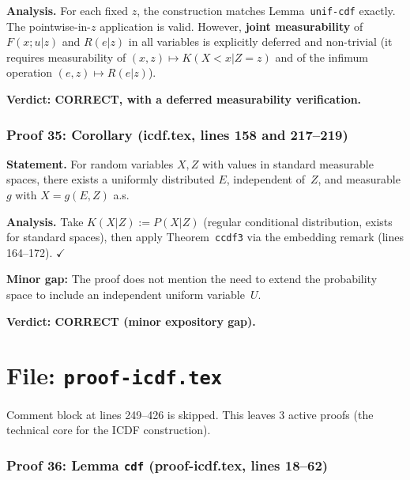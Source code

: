 \documentclass{article}
\begin{document}
\textbf{Analysis.}
For each fixed $z$, the construction matches Lemma~\texttt{unif-cdf} exactly.
The pointwise-in-$z$ application is valid.
However, \textbf{joint measurability} of $F(x;u|z)$ and $R(e|z)$ in all variables
is explicitly deferred and non-trivial (it requires measurability of
$(x,z)\mapsto K(X<x|Z=z)$ and of the infimum operation $(e,z)\mapsto R(e|z)$).

\textbf{Verdict: CORRECT, with a deferred measurability verification.}

\section{Proof 35: Corollary (icdf.tex, lines 158 and 217--219)}

\textbf{Statement.} For random variables $X,Z$ with values in standard measurable
spaces, there exists a uniformly distributed $E$, independent of~$Z$, and
measurable $g$ with $X=g(E,Z)$ a.s.

\textbf{Analysis.}
Take $K(X|Z):=P(X|Z)$ (regular conditional distribution, exists for standard
spaces), then apply Theorem~\texttt{ccdf3} via the embedding remark (lines 164--172).  $\checkmark$

\textbf{Minor gap:} The proof does not mention the need to extend the probability
space to include an independent uniform variable~$U$.

\textbf{Verdict: CORRECT (minor expository gap).}

\part*{File: \texttt{proof-icdf.tex}}

Comment block at lines 249--426 is skipped.
This leaves 3 active proofs (the technical core for the ICDF construction).

\section{Proof 36: Lemma \texttt{cdf} (proof-icdf.tex, lines 18--62)}
\end{document}
